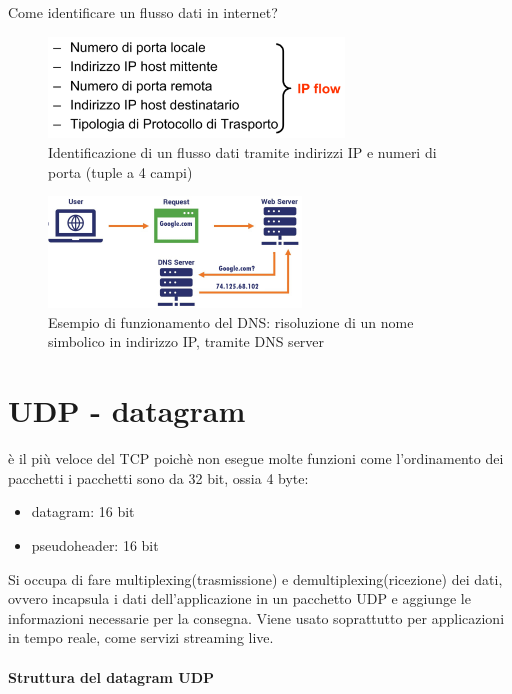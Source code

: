 Come identificare un flusso dati in internet?

\begin{figure}[h!]
    \centering
    \includegraphics[width=0.7\textwidth]{images/flusso_IP.png}
    \caption{Identificazione di un flusso dati tramite indirizzi IP e numeri di porta (tuple a 4 campi)}
    \label{fig:flussoIP}
\end{figure}

\begin{figure}[h!]
    \centering
    \includegraphics[width=0.6\textwidth]{images/DNS.jpg}
    \caption{Esempio di funzionamento del DNS: risoluzione di un nome simbolico in indirizzo IP, tramite DNS server}
    \label{fig:dns_example}
\end{figure}

\section{UDP - datagram}

è il più veloce del TCP poichè non esegue molte funzioni come l'ordinamento dei pacchetti 
i pacchetti sono da 32 bit, ossia 4 byte:
\begin{itemize}
    \item datagram: 16 bit
    \item pseudoheader: 16 bit
\end{itemize}

Si occupa di fare multiplexing(trasmissione) e demultiplexing(ricezione) dei dati, ovvero incapsula i dati dell'applicazione in un pacchetto UDP e aggiunge le informazioni necessarie per la consegna.
Viene usato soprattutto per applicazioni in tempo reale, come servizi streaming live.

\paragraph{Struttura del datagram UDP}

